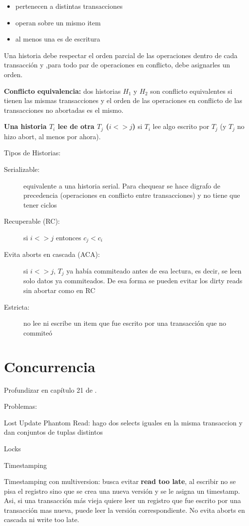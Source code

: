 \begin{itemize}
	\item pertenecen a distintas transacciones
	\item operan sobre un mismo item
	\item al menos una es de escritura
\end{itemize}

Una historia debe respectar el orden parcial de las operaciones dentro de cada transacción y ,para todo par de operaciones en conflicto, debe asignarles un orden.

\textbf{Conflicto equivalencia:} dos historias $H_1$ y $H_2$ son conflicto equivalentes si tienen las mismas transacciones y el orden de las operaciones en conflicto de las transacciones no abortadas es el mismo.

\textbf{Una historia $T_i$ lee de otra $T_j$ ($i <> j$)} si $T_i$ lee algo escrito por $T_j$ (y $T_j$ no hizo abort, al menos por ahora).

Tipos de Historias:

\begin{description}
	\item[Serializable:] equivalente a una historia serial. Para chequear se hace digrafo de precedencia (operaciones en conflicto entre transacciones) y no tiene que tener ciclos
	\item[Recuperable (RC):] si $i <> j$ entonces $c_j < c_i$
	\item[Evita aborts en cascada (ACA):] si $i <> j$, $T_j$ ya había commiteado antes de esa lectura, es decir, se leen solo datos ya commiteados. De esa forma se pueden evitar los dirty reads sin abortar como en RC
	\item[Estricta:] no lee ni escribe un item que fue escrito por una transacción que no commiteó
\end{description}

\section{Concurrencia}

Profundizar en capítulo 21 de \cite{elmasri2015}.

Problemas:

Lost Update
Phantom Read: hago dos selects iguales en la misma transaccion y dan conjuntos de tuplas distintos

Locks

Timestamping

Timestamping con multiversion: busca evitar \textbf{read too late}, al escribir no se pisa el registro sino que se crea una nueva versión y se le asigna un timestamp. Asi, si una transacción más vieja quiere leer un registro que fue escrito por una transacción mas nueva, puede leer la versión correspondiente. No evita aborts en cascada ni write too late.

